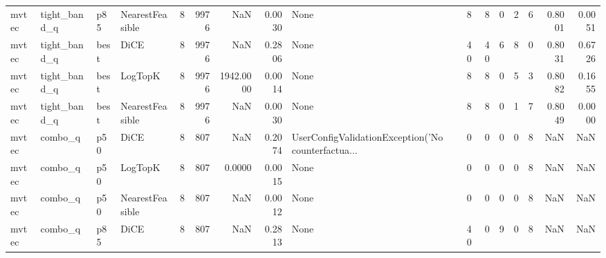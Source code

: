 \begin{tabular}{llllrrrrlrrrrrrr}
  mvtec &         tight\_band\_q &    p85 & NearestFeasible &            8 &                 9976 &                      NaN &      0.0030 &                                               None &      8 &            8 &        0 &              2 &          6 &             0.8001 &         0.0051 \\
  mvtec &         tight\_band\_q &   best &            DiCE &            8 &                 9976 &                      NaN &      0.2806 &                                               None &     40 &           40 &        6 &              8 &          0 &             0.8031 &         0.6726 \\
  mvtec &         tight\_band\_q &   best &         LogTopK &            8 &                 9976 &                1942.0000 &      0.0014 &                                               None &      8 &            8 &        0 &              5 &          3 &             0.8082 &         0.1655 \\
  mvtec &         tight\_band\_q &   best & NearestFeasible &            8 &                 9976 &                      NaN &      0.0030 &                                               None &      8 &            8 &        0 &              1 &          7 &             0.8049 &         0.0000 \\
  mvtec &              combo\_q &    p50 &            DiCE &            8 &                  807 &                      NaN &      0.2074 & UserConfigValidationException('No counterfactua... &      0 &            0 &        0 &              0 &          8 &                NaN &            NaN \\
  mvtec &              combo\_q &    p50 &         LogTopK &            8 &                  807 &                   0.0000 &      0.0015 &                                               None &      0 &            0 &        0 &              0 &          8 &                NaN &            NaN \\
  mvtec &              combo\_q &    p50 & NearestFeasible &            8 &                  807 &                      NaN &      0.0012 &                                               None &      0 &            0 &        0 &              0 &          8 &                NaN &            NaN \\
  mvtec &              combo\_q &    p85 &            DiCE &            8 &                  807 &                      NaN &      0.2813 &                                               None &     40 &            0 &        9 &              0 &          8 &                NaN &            NaN \\

\end{tabular}
